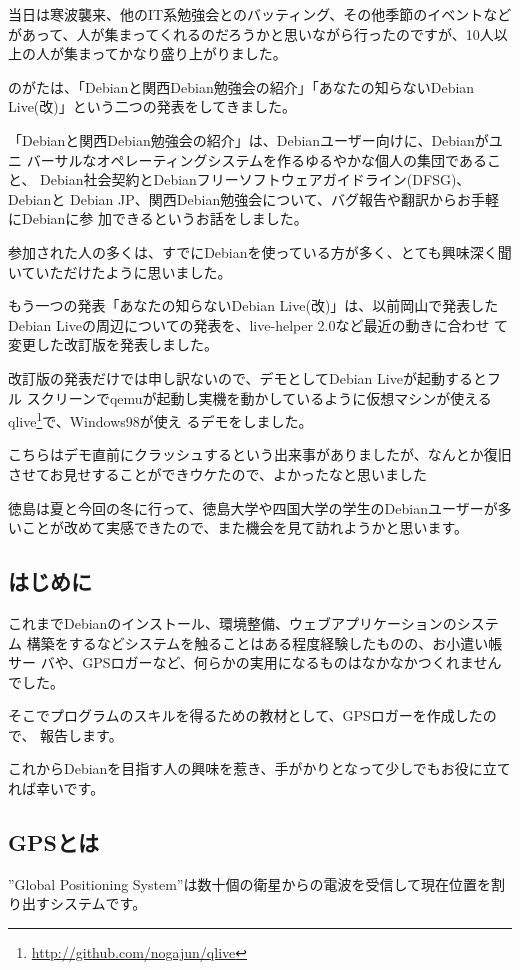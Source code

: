 \documentclass[mingoth,a4paper]{jsarticle}
\begin{document}
当日は寒波襲来、他のIT系勉強会とのバッティング、その他季節のイベントなど
があって、人が集まってくれるのだろうかと思いながら行ったのですが、10人以
上の人が集まってかなり盛り上がりました。

のがたは、「Debianと関西Debian勉強会の紹介」「あなたの知らないDebian
Live(改)」という二つの発表をしてきました。

「Debianと関西Debian勉強会の紹介」は、Debianユーザー向けに、Debianがユニ
バーサルなオペレーティングシステムを作るゆるやかな個人の集団であること、
Debian社会契約とDebianフリーソフトウェアガイドライン(DFSG)、Debianと
Debian JP、関西Debian勉強会について、バグ報告や翻訳からお手軽にDebianに参
加できるというお話をしました。

参加された人の多くは、すでにDebianを使っている方が多く、とても興味深く聞
いていただけたように思いました。

もう一つの発表「あなたの知らないDebian Live(改)」は、以前岡山で発表した
Debian Liveの周辺についての発表を、live-helper 2.0など最近の動きに合わせ
て変更した改訂版を発表しました。

改訂版の発表だけでは申し訳ないので、デモとしてDebian Liveが起動するとフル
スクリーンでqemuが起動し実機を動かしているように仮想マシンが使える
qlive\footnote{\url{http://github.com/nogajun/qlive}}で、Windows98が使え
るデモをしました。

こちらはデモ直前にクラッシュするという出来事がありましたが、なんとか復旧
させてお見せすることができウケたので、よかったなと思いました

徳島は夏と今回の冬に行って、徳島大学や四国大学の学生のDebianユーザーが多
いことが改めて実感できたので、また機会を見て訪れようかと思います。



\subsection{はじめに}

これまでDebianのインストール、環境整備、ウェブアプリケーションのシステム
構築をするなどシステムを触ることはある程度経験したものの、お小遣い帳サー
バや、GPSロガーなど、何らかの実用になるものはなかなかつくれませんでした。

そこでプログラムのスキルを得るための教材として、GPSロガーを作成したので、
報告します。

これからDebianを目指す人の興味を惹き、手がかりとなって少しでもお役に立て
れば幸いです。

\subsection{GPSとは}
”Global Positioning System”は数十個の衛星からの電波を受信して現在位置を割り出すシステムです。
\end{document}
